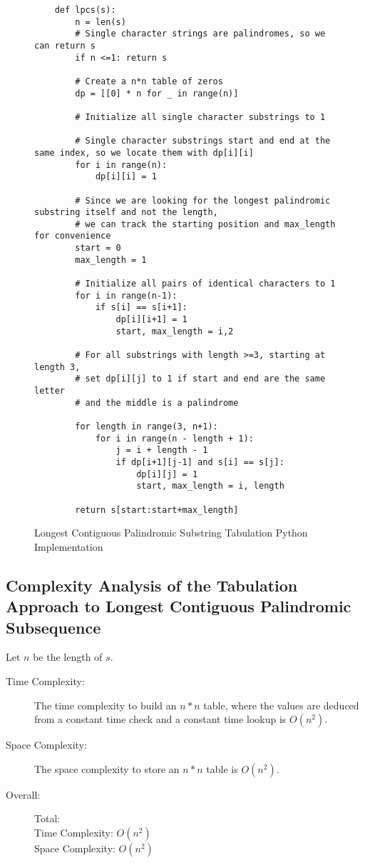 \begin{figure}[H]
    \centering
    \begin{lstlisting}
    def lpcs(s):
        n = len(s)
        # Single character strings are palindromes, so we can return s
        if n <=1: return s
    
        # Create a n*n table of zeros
        dp = [[0] * n for _ in range(n)]
    
        # Initialize all single character substrings to 1

        # Single character substrings start and end at the same index, so we locate them with dp[i][i]
        for i in range(n):
            dp[i][i] = 1
    
        # Since we are looking for the longest palindromic substring itself and not the length,
        # we can track the starting position and max_length for convenience
        start = 0
        max_length = 1
    
        # Initialize all pairs of identical characters to 1
        for i in range(n-1):
            if s[i] == s[i+1]:
                dp[i][i+1] = 1
                start, max_length = i,2
    
        # For all substrings with length >=3, starting at length 3, 
        # set dp[i][j] to 1 if start and end are the same letter
        # and the middle is a palindrome
                
        for length in range(3, n+1):
            for i in range(n - length + 1):
                j = i + length - 1
                if dp[i+1][j-1] and s[i] == s[j]:
                    dp[i][j] = 1
                    start, max_length = i, length
    
        return s[start:start+max_length]
    \end{lstlisting}
    \caption{Longest Contiguous Palindromic Substring Tabulation Python Implementation}
    \label{fig:lpcs-dp}
\end{figure}

\subsection{Complexity Analysis of the Tabulation Approach to Longest Contiguous Palindromic Subsequence}
Let $n$ be the length of $s$.

\begin{description}
    \item[Time Complexity:]
        The time complexity to build an $n * n$ table,
        where the values are deduced from a constant time check and a constant time lookup is $O(n^2)$. 

    \item[Space Complexity:] 
        The space complexity to store an $n * n$ table is $O(n^2)$.

        
    \item[Overall:] Total:\\
        Time Complexity: $O(n^2)$\\
        Space Complexity: $O(n^2)$
    
\end{description}